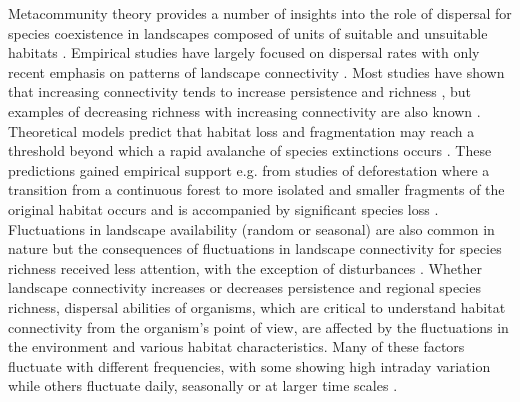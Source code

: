 \documentclass[a4paper,12pt]{article}
\begin{document}
Metacommunity theory provides a number of insights into the role of dispersal for species coexistence in landscapes composed of units of suitable and unsuitable habitats \citep{Holyoaketal2005}. Empirical studies have largely focused on dispersal rates with only recent emphasis on patterns of landscape connectivity \citep{kneitel2004, cadotte2006}. Most studies have shown that increasing connectivity tends to increase persistence and richness \citep{ellneretal2001, foxetal2011}, but examples of decreasing richness with increasing connectivity are also known \citep{daviesetal2009, altermattetal2011}. Theoretical models predict that habitat loss and fragmentation may reach a threshold beyond which a rapid avalanche of species extinctions occurs \citep{fahrig2002, ovaskainenhanski2003, rybickihanski2013}. These predictions gained empirical support e.g. from studies of deforestation where a transition from a continuous forest to more isolated and smaller fragments of the original habitat occurs and is accompanied by significant species loss \citep{LauranceEtAl1997, MetzgerEtAl2009}. Fluctuations in landscape availability (random or seasonal) are also common in nature \citep{Sprugel1991, RuizEtAl2014} but the consequences of fluctuations in landscape connectivity for species richness received less attention, with the exception of disturbances \citep{Sousa1984, SuppErnest2014}. Whether landscape connectivity increases or decreases persistence and regional species richness, dispersal abilities of organisms, which are critical to understand habitat connectivity from the organism's point of view, are affected by the fluctuations in the environment and various habitat characteristics. Many of these factors fluctuate with different frequencies, with some showing high intraday variation while others fluctuate daily, seasonally or at larger time scales \citep{StensethEtAl2002}.
\end{document}
